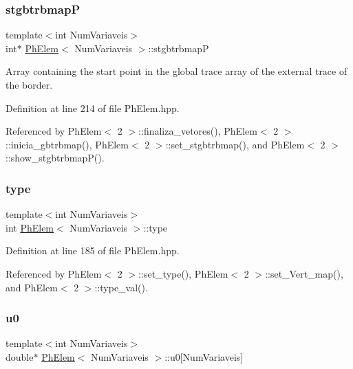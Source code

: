 \mbox{\label{classPhElem_a6b38afded290e7a4cfb4a215a7ebec4e}} 
\subsubsection{\texorpdfstring{stgbtrbmapP}{stgbtrbmapP}}
{\footnotesize\ttfamily template$<$int Num\+Variaveis$>$ \\
int$\ast$ \hyperlink{classPhElem}{Ph\+Elem}$<$ Num\+Variaveis $>$\+::stgbtrbmapP\hspace{0.3cm}{\ttfamily [protected]}}



Array containing the start point in the global trace array of the external trace of the border. 



Definition at line 214 of file Ph\+Elem.\+hpp.



Referenced by Ph\+Elem$<$ 2 $>$\+::finaliza\+\_\+vetores(), Ph\+Elem$<$ 2 $>$\+::inicia\+\_\+gbtrbmap(), Ph\+Elem$<$ 2 $>$\+::set\+\_\+stgbtrbmap(), and Ph\+Elem$<$ 2 $>$\+::show\+\_\+stgbtrbmap\+P().

\mbox{\label{classPhElem_a1ed1b45136a718afef64c846fb905546}} 
\subsubsection{\texorpdfstring{type}{type}}
{\footnotesize\ttfamily template$<$int Num\+Variaveis$>$ \\
int \hyperlink{classPhElem}{Ph\+Elem}$<$ Num\+Variaveis $>$\+::type\hspace{0.3cm}{\ttfamily [protected]}}



Definition at line 185 of file Ph\+Elem.\+hpp.



Referenced by Ph\+Elem$<$ 2 $>$\+::set\+\_\+type(), Ph\+Elem$<$ 2 $>$\+::set\+\_\+\+Vert\+\_\+map(), and Ph\+Elem$<$ 2 $>$\+::type\+\_\+val().

\mbox{\label{classPhElem_a560dc47ac8a684d84b05851ce52e044b}} 
\subsubsection{\texorpdfstring{u0}{u0}}
{\footnotesize\ttfamily template$<$int Num\+Variaveis$>$ \\
double$\ast$ \hyperlink{classPhElem}{Ph\+Elem}$<$ Num\+Variaveis $>$\+::u0\mbox{[}Num\+Variaveis\mbox{]}\hspace{0.3cm}{\ttfamily [protected]}}



